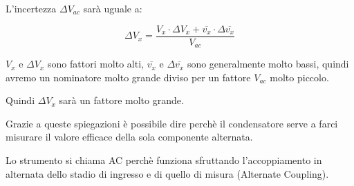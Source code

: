 L'incertezza $\Delta V_{ac}$ sarà uguale a: 

{
    \Large 
    \begin{equation}
        \Delta V_x 
        =
        \frac{V_x \cdot \Delta V_x + \overline{v_x} \cdot \Delta \overline{v_x}}{V_{ac}}
    \end{equation}
}

$V_x$ e $\Delta V_x$ sono fattori molto alti, $\overline{v_x}$ e $\Delta \overline{v_x}$ sono generalmente molto bassi, 
quindi avremo un nominatore molto grande diviso per un fattore $V_{ac}$ molto piccolo. \newline 

Quindi $\Delta V_x$ sarà un fattore molto grande. \newline 

Grazie a queste spiegazioni è possibile dire perchè il condensatore serve a farci misurare il valore efficace della sola componente alternata. \newline 

Lo strumento si chiama AC perchè funziona sfruttando l'accoppiamento in alternata dello stadio di ingresso e di quello di misura (Alternate Coupling). \newline

\newpage 

